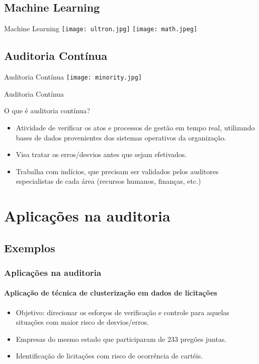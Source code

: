 \documentclass[aspectratio=169]{beamer}
\begin{document}
\subsection{Machine Learning}
\begin{frame}{Machine Learning}
    \centering
    \texttt{[image: ultron.jpg]}
    \texttt{[image: math.jpeg]}
\end{frame}

\subsection{Auditoria Contínua}
\begin{frame}{Auditoria Contínua}
    \centering
    \texttt{[image: minority.jpg]}
\end{frame}


\begin{frame}{Auditoria Contínua}
    \centering
    \begin{block}{O que é auditoria contínua?}
        \begin{itemize}
            \item Atividade de verificar os atos e processos de gestão em tempo real,
                utilizando bases de dados provenientes dos sistemas operativos da organização.
            \item Visa tratar os erros/desvios antes que sejam efetivados.
            \item Trabalha com indícios, que precisam ser validados pelos auditores
                especialistas de cada área (recursos humanos, finanças, etc.)
        \end{itemize}
    \end{block}
\end{frame}

\section{Aplicações na auditoria}
\subsection{Exemplos}
\begin{frame}
    \frametitle{Aplicações na auditoria}
    \framesubtitle{Aplicação de técnica de clusterização em dados de licitações}
    \begin{itemize}
        \item Objetivo: direcionar os esforços de verificação e controle para aquelas
            situações com maior risco de desvios/erros. 
        \item Empresas do mesmo estado que participaram de 233 pregões juntas.
        \item Identificação de licitações com risco de ocorrência de cartéis.
    \end{itemize}\cite{Silva2020}
\end{frame}
\end{document}
